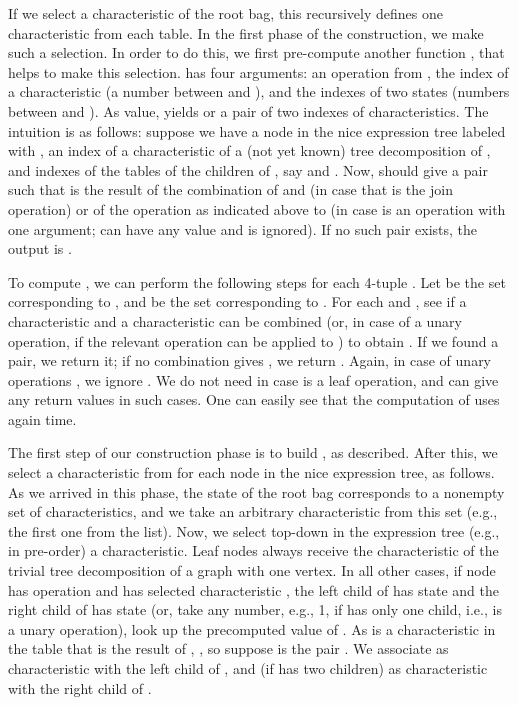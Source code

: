 \documentclass[a4paper,11pt]{article}
\theoremstyle{definition}
\theoremstyle{remark}
\begin{document}
If we select a characteristic of the root bag, this recursively
defines one characteristic from each table.  In the first phase of the
construction, we make such a selection.  In order to do this, we first
pre-compute another function , that helps to make this selection.
 has four arguments: an operation from , the index of a
characteristic (a number between  and ), and the indexes of two
states (numbers between  and ).  As value,  yields
 or a pair of two indexes of characteristics.  The intuition
is as follows: suppose we have a node  in the nice expression tree
labeled with , an index  of a characteristic of a (not yet
known) tree decomposition of , and indexes of the tables of the
children of , say  and .  Now,
 should give a pair  such
that  is the result of the combination of  and 
(in case that  is the join operation) or of the operation as
indicated above to  (in case  is an operation with one
argument;  can have any value and is ignored).  If no such
pair exists, the output is .

To compute , we can perform the following steps for each 4-tuple
.  Let  be the set
corresponding to , and  be the set
corresponding to .  For each  and , see
if a characteristic  and a characteristic  can be combined (or,
in case of a unary operation, if the relevant operation can be applied
to ) to obtain .  If we found a pair, we return it; if no
combination gives , we return .  Again, in case of unary
operations , we ignore .  We do not need  in case  is a
leaf operation, and can give any return values in such cases.  One can
easily see that the computation of  uses again  time.

The first step of our construction phase is to build , as
described.  After this, we select a characteristic from 
for each node in the nice expression tree, as follows.  As we arrived
in this phase, the state of the root bag corresponds to a nonempty set
of characteristics, and we take an arbitrary characteristic from this
set (e.g., the first one from the list).  Now, we select top-down in
the expression tree (e.g., in pre-order) a characteristic.  Leaf nodes
always receive the characteristic of the trivial tree decomposition of
a graph with one vertex.  In all other cases, if node  has
operation  and has selected characteristic , the left child of
 has state  and the right child of  has state 
(or, take any number, e.g., 1, if  has only one child, i.e.,  is
a unary operation), look up the precomputed value of
.  As  is a characteristic in the table
that is the result of , , so
suppose  is the pair .  We associate  as
characteristic with the left child of , and (if  has two
children)  as characteristic with the right child of .
\end{document}
